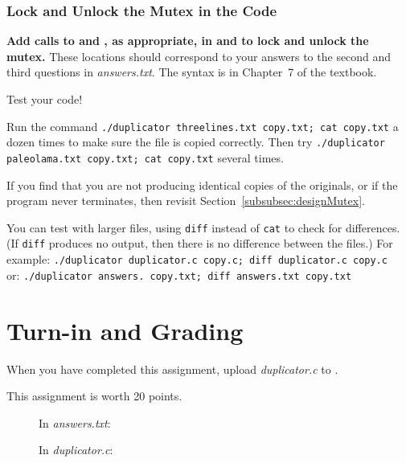     \subsubsection{Lock and Unlock the Mutex in the Code}

    \textbf{Add calls to  and , as appropriate, in  and  to lock and unlock the mutex.}
    These locations should correspond to your answers to the second and third questions in \textit{answers.txt}.
    The syntax is in Chapter~7 of the textbook.

    Test your code!

    Run the command \texttt{./duplicator threelines.txt copy.txt; cat copy.txt} a dozen times to make sure the file is copied correctly.
    Then try \texttt{./duplicator paleolama.txt copy.txt; cat copy.txt} several times.

    If you find that you are not producing identical copies of the originals, or if the program never terminates, then revisit Section~\ref{subsubsec:designMutex}.

    You can test with larger files, using \texttt{diff} instead of \texttt{cat} to check for differences.
    (If \texttt{diff} produces no output, then there is no difference between the files.)
    For example: \texttt{./duplicator duplicator.c copy.c; diff duplicator.c copy.c} \\
    or: \texttt{./duplicator answers. copy.txt; diff answers.txt copy.txt}


    \section{Turn-in and Grading}

    When you have completed this assignment, upload \textit{duplicator.c} to
    \filesubmission.

    This assignment is worth 20 points. \\

    \begin{description}
        \item[] In \textit{answers.txt}:
        \item[] In \textit{duplicator.c}:
    \end{description}

